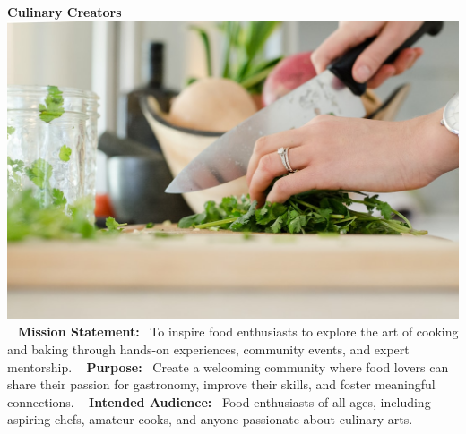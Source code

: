 \documentclass[12pt]{article}
\begin{document}
        \begin{center}
        \textbf{\Huge Culinary Creators} \
        \vspace{0.5in}
        \includegraphics[width=0.8	extwidth]{images/Cooking.jpg} \
        \vspace{0.5in}
        \textbf{\Large Mission Statement:} \
        To inspire food enthusiasts to explore the art of cooking and baking through hands-on experiences, community events, and expert mentorship. \
        \vspace{0.25in}
        \textbf{\Large Purpose:} \
        Create a welcoming community where food lovers can share their passion for gastronomy, improve their skills, and foster meaningful connections. \
        \vspace{0.25in}
        \textbf{\Large Intended Audience:} \
        Food enthusiasts of all ages, including aspiring chefs, amateur cooks, and anyone passionate about culinary arts.
        \end{center}
        
\end{document}
